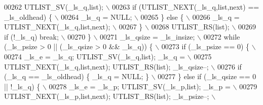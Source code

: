 \begin{DoxyCode}
00262 \textcolor{preprocessor}{          UTLIST\_SV(\_ls\_q,list);                                                               \(\backslash\)}
00263 \textcolor{preprocessor}{          if (UTLIST\_NEXT(\_ls\_q,list,next) == \_ls\_oldhead) \{                                   \(\backslash\)}
00264 \textcolor{preprocessor}{            \_ls\_q = NULL;                                                                      \(\backslash\)}
00265 \textcolor{preprocessor}{          \} else \{                                                                             \(\backslash\)}
00266 \textcolor{preprocessor}{            \_ls\_q = UTLIST\_NEXT(\_ls\_q,list,next);                                              \(\backslash\)}
00267 \textcolor{preprocessor}{          \}                                                                                    \(\backslash\)}
00268 \textcolor{preprocessor}{          UTLIST\_RS(list);                                                                     \(\backslash\)}
00269 \textcolor{preprocessor}{          if (!\_ls\_q) break;                                                                   \(\backslash\)}
00270 \textcolor{preprocessor}{        \}                                                                                      \(\backslash\)}
00271 \textcolor{preprocessor}{        \_ls\_qsize = \_ls\_insize;                                                                \(\backslash\)}
00272 \textcolor{preprocessor}{        while (\_ls\_psize > 0 || (\_ls\_qsize > 0 && \_ls\_q)) \{                                    \(\backslash\)}
00273 \textcolor{preprocessor}{          if (\_ls\_psize == 0) \{                                                                \(\backslash\)}
00274 \textcolor{preprocessor}{            \_ls\_e = \_ls\_q; UTLIST\_SV(\_ls\_q,list); \_ls\_q =                                      \(\backslash\)}
00275 \textcolor{preprocessor}{              UTLIST\_NEXT(\_ls\_q,list,next); UTLIST\_RS(list); \_ls\_qsize--;                      \(\backslash\)}
00276 \textcolor{preprocessor}{            if (\_ls\_q == \_ls\_oldhead) \{ \_ls\_q = NULL; \}                                        \(\backslash\)}
00277 \textcolor{preprocessor}{          \} else if (\_ls\_qsize == 0 || !\_ls\_q) \{                                               \(\backslash\)}
00278 \textcolor{preprocessor}{            \_ls\_e = \_ls\_p; UTLIST\_SV(\_ls\_p,list); \_ls\_p =                                      \(\backslash\)}
00279 \textcolor{preprocessor}{              UTLIST\_NEXT(\_ls\_p,list,next); UTLIST\_RS(list); \_ls\_psize--;                      \(\backslash\)}

\end{DoxyCode}
